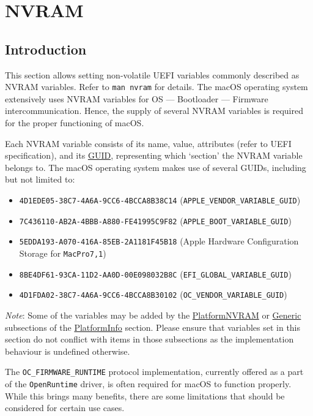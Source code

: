\documentclass[]{article}
\makeatletter
\providecommand{\tightlist}{%
  \setlength{\itemsep}{0pt}\setlength{\parskip}{0pt}}
\renewcommand{\label}[1]{%
\zref@wrapper@immediate{\oldlabel{#1}}}  %
\makeatother
\begin{document}
\section{NVRAM}\label{nvram}

\subsection{Introduction}\label{nvramintro}

This section allows setting non-volatile UEFI variables commonly described
as NVRAM variables. Refer to \texttt{man\ nvram} for details.
The macOS operating system extensively uses NVRAM variables for OS --- Bootloader
--- Firmware intercommunication. Hence, the supply of several NVRAM variables
is required for the proper functioning of macOS.

Each NVRAM variable consists of its name, value, attributes (refer to
UEFI specification), and its
\href{https://en.wikipedia.org/wiki/Universally_unique_identifier}{GUID},
representing which `section' the NVRAM variable belongs to. The macOS
operating system makes use of several GUIDs, including but not limited to:

\begin{itemize}
\tightlist
\item
  \texttt{4D1EDE05-38C7-4A6A-9CC6-4BCCA8B38C14}
  (\texttt{APPLE\_VENDOR\_VARIABLE\_GUID})
\item
  \texttt{7C436110-AB2A-4BBB-A880-FE41995C9F82}
  (\texttt{APPLE\_BOOT\_VARIABLE\_GUID})
\item
  \texttt{5EDDA193-A070-416A-85EB-2A1181F45B18}
  (Apple Hardware Configuration Storage for \texttt{MacPro7,1})
\item
  \texttt{8BE4DF61-93CA-11D2-AA0D-00E098032B8C}
  (\texttt{EFI\_GLOBAL\_VARIABLE\_GUID})
\item
  \texttt{4D1FDA02-38C7-4A6A-9CC6-4BCCA8B30102}
  (\texttt{OC\_VENDOR\_VARIABLE\_GUID})
\end{itemize}

\emph{Note}: Some of the variables may be added by the
\hyperref[platforminfonvram]{PlatformNVRAM} or
\hyperref[platforminfogeneric]{Generic} subsections of the
\hyperref[platforminfo]{PlatformInfo} section.
Please ensure that variables set in this section do not conflict with items
in those subsections as the implementation behaviour is undefined otherwise.

The \texttt{OC\_FIRMWARE\_RUNTIME} protocol implementation, currently offered
as a part of the \texttt{OpenRuntime} driver, is often required for macOS to
function properly. While this brings many benefits, there are some
limitations that should be considered for certain use cases.
\end{document}
